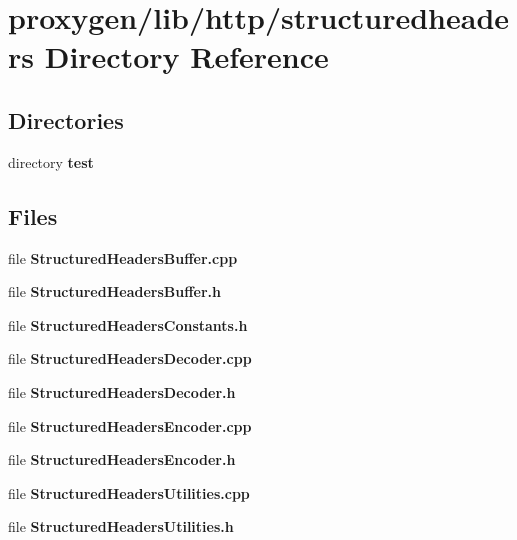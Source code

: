 \section{proxygen/lib/http/structuredheaders Directory Reference}
\label{dir_3fc508b99a460c8f0f8106382f0462de}
\subsection*{Directories}
\begin{DoxyCompactItemize}
\item 
directory {\bf test}
\end{DoxyCompactItemize}
\subsection*{Files}
\begin{DoxyCompactItemize}
\item 
file {\bf Structured\+Headers\+Buffer.\+cpp}
\item 
file {\bf Structured\+Headers\+Buffer.\+h}
\item 
file {\bf Structured\+Headers\+Constants.\+h}
\item 
file {\bf Structured\+Headers\+Decoder.\+cpp}
\item 
file {\bf Structured\+Headers\+Decoder.\+h}
\item 
file {\bf Structured\+Headers\+Encoder.\+cpp}
\item 
file {\bf Structured\+Headers\+Encoder.\+h}
\item 
file {\bf Structured\+Headers\+Utilities.\+cpp}
\item 
file {\bf Structured\+Headers\+Utilities.\+h}
\end{DoxyCompactItemize}

